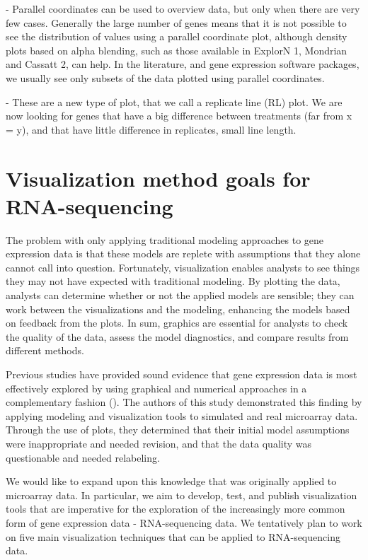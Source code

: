 \documentclass[11pt,a4paper,oldfontcommands,openany]{memoir}
\numberwithin{equation}{section} %
\begin{document}
- Parallel coordinates can be used to overview data, but only when there are very few cases. Generally the large number of genes means that it is not possible to see the distribution of values using a parallel coordinate plot, although density plots based on alpha blending, such as those available in ExplorN 1, Mondrian and Cassatt 2, can help. In the literature, and gene expression software packages, we usually see only subsets of the data plotted using parallel coordinates.

- These are a new type of plot, that we call a replicate line (RL) plot. We are now looking for genes that have a big difference between treatments (far from x = y), and that have little difference in replicates, small line length.

\chapter{Visualization method goals for RNA-sequencing}

The problem with only applying traditional modeling approaches to gene expression data is that these models are replete with assumptions that they alone cannot call into question. Fortunately, visualization enables analysts to see things they may not have expected with traditional modeling. By plotting the data, analysts can determine whether or not the applied models are sensible; they can work between the visualizations and the modeling, enhancing the models based on feedback from the plots. In sum, graphics are essential for analysts to check the quality of the data, assess the model diagnostics, and compare results from different methods.

Previous studies have provided sound evidence that gene expression data is most effectively explored by using graphical and numerical approaches in a complementary fashion (\citealt{jds}). The authors of this study demonstrated this finding by applying modeling and visualization tools to simulated and real microarray data. Through the use of plots, they determined that their initial model assumptions were inappropriate and needed revision, and that the data quality was questionable and needed relabeling. 

We would like to expand upon this knowledge that was originally applied to microarray data. In particular, we aim to develop, test, and publish visualization tools that are imperative for the exploration of the increasingly more common form of gene expression data - RNA-sequencing data. We tentatively plan to work on five main visualization techniques that can be applied to RNA-sequencing data.
\end{document}

